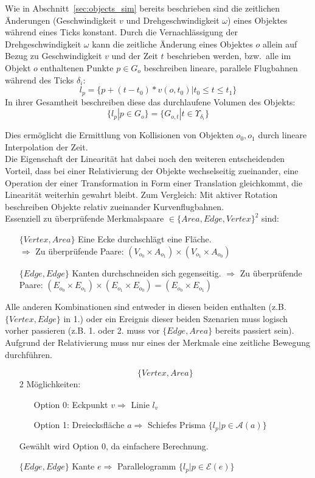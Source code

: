 Wie in Abschnitt~\ref{sec:objects_sim} bereits beschrieben sind die zeitlichen Änderungen (Geschwindigkeit $v$ und Drehgeschwindigkeit $\omega$) eines Objektes während eines Ticks konstant. Durch die Vernachlässigung der Drehgeschwindigkeit $\omega$ kann die zeitliche Änderung eines Objektes $o$ allein auf Bezug zu Geschwindigkeit $v$ und der Zeit $t$ beschrieben werden, bzw.~alle im Objekt $o$ enthaltenen Punkte $p \in G_o$ beschreiben lineare, parallele Flugbahnen während des Ticks $\delta_i$:
$$l_p = \{p + (t - t_0) * v(o, t_0) | t_0 \leq t \leq t_1\}$$
In ihrer Gesamtheit beschreiben diese das durchlaufene Volumen des Objekts:
$$\{l_p|p\in G_o\} = \{G_{o, t}| t \in \Upsilon_{\delta_i}\}$$

Dies ermöglicht die Ermittlung von Kollisionen von Objekten $o_0, o_1$ durch lineare Interpolation der Zeit.\\
Die Eigenschaft der Linearität hat dabei noch den weiteren entscheidenden Vorteil, dass bei einer Relativierung der Objekte wechselseitig zueinander, eine Operation der einer Transformation in Form einer Translation gleichkommt, die Linearität weiterhin gewahrt bleibt. Zum Vergleich: Mit aktiver Rotation beschreiben Objekte relativ zueinander Kurvenflugbahnen.\\
Essenziell zu überprüfende Merkmalspaare $\in \{Area, Edge, Vertex\}^2$ sind:
		\begin{itemize}
			\item [$\{Vertex, Area\}$] Eine Ecke durchschlägt eine Fläche.\\
				$\Rightarrow$ Zu überprüfende Paare: $(V_{o_0}\times A_{o_1})\times (V_{o_1}\times A_{o_0})$
			\item [$\{Edge, Edge\}$] Kanten durchschneiden sich gegenseitig.
				$\Rightarrow$ Zu überprüfende Paare: $(E_{o_0}\times E_{o_1})\times (E_{o_1}\times E_{o_0}) = (E_{o_0}\times E_{o_1})$
		\end{itemize}
		Alle anderen Kombinationen sind entweder in diesen beiden enthalten (z.B. $\{Vertex, Edge\}$ in 1.) oder ein Ereignis dieser beiden Szenarien muss logisch vorher passieren (z.B. 1. oder 2. muss vor $\{Edge, Area\}$ bereits passiert sein).
\ \\
		Aufgrund der Relativierung muss nur eines der Merkmale eine zeitliche Bewegung durchführen.
		\begin{itemize}
			\item [$$\{Vertex, Area\}$$] 2 Möglichkeiten:
				\begin{itemize}
					\item[Option 0:] Eckpunkt $v \Rightarrow$ Linie $l_v$
					\item[Option 1:] Dreiecksfläche $a \Rightarrow$ Schiefes Prisma $ \{l_p | p \in \mathcal{A}(a)\}$
				\end{itemize}
				Gewählt wird Option 0, da einfachere Berechnung.
			\item [$\{Edge, Edge\}$] Kante $e \Rightarrow$ Parallelogramm $\{l_p | p \in \mathcal{E}(e)\}$
		\end{itemize}
